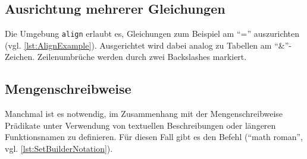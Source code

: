 
\subsection{Ausrichtung mehrerer Gleichungen}

Die Umgebung \texttt{align} erlaubt es, Gleichungen zum Beispiel am \enquote{=} auszurichten (vgl. \cref{lst:AlignExample}).
Ausgerichtet wird dabei analog zu Tabellen am \enquote{\&}-Zeichen.
Zeilenumbrüche werden durch zwei Backslashes markiert.


\subsection{Mengenschreibweise}

Manchmal ist es notwendig, im Zusammenhang mit der Mengenschreibweise Prädikate unter Verwendung von textuellen Beschreibungen oder längeren Funktionsnamen zu definieren.
Für diesen Fall gibt es den Befehl \texttt{\mathrm{}} (\enquote{math roman}, vgl. \cref{lst:SetBuilderNotation}).

